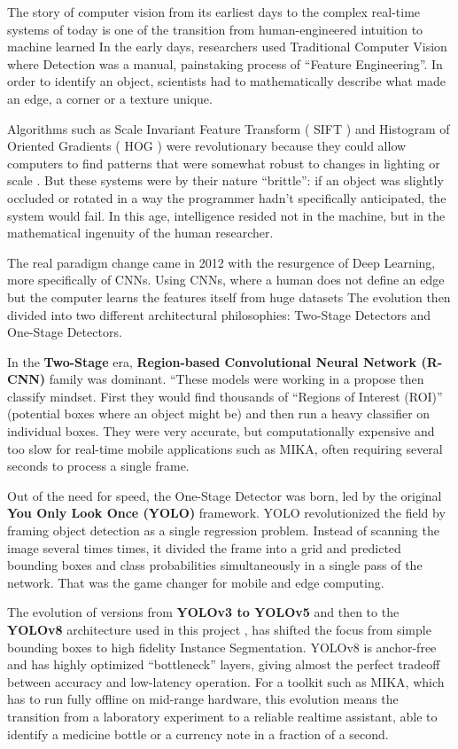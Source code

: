\documentclass[12pt,a4paper]{report}
\begin{document}
\noindent The story of computer vision from its earliest days to the complex real-time systems of today is one of the transition from human-engineered intuition to machine learned In the early days, researchers used Traditional Computer Vision where Detection was a manual, painstaking process of “Feature Engineering”. In order to identify an object, scientists had to mathematically describe what made an edge, a corner or a texture unique.
 
\noindent Algorithms such as Scale Invariant Feature Transform ( SIFT ) and Histogram of Oriented Gradients ( HOG ) were revolutionary because they could allow computers to find patterns that were somewhat robust to changes in lighting or scale . But these systems were by their nature “brittle”: if an object was slightly occluded or rotated in a way the programmer hadn’t specifically anticipated, the system would fail. In this age, intelligence resided not in the machine, but in the mathematical ingenuity of the human researcher. 

\noindent The real paradigm change came in 2012 with the resurgence of Deep Learning, more specifically of CNNs. Using CNNs, where a human does not define an edge but the computer learns the features itself from huge datasets The evolution then divided into two different architectural philosophies: Two-Stage Detectors and One-Stage Detectors.

\noindent In the \textbf{Two-Stage} era, \textbf{Region-based Convolutional Neural Network (R-CNN)} family was dominant. “These models were working in a propose then classify mindset. First they would find thousands of “Regions of Interest (ROI)” (potential boxes where an object might be) and then run a heavy classifier on individual boxes. They were very accurate, but computationally expensive and too slow for real-time mobile applications such as MIKA, often requiring several seconds to process a single frame.
 
\noindent Out of the need for speed, the One-Stage Detector was born, led by the original \textbf{You Only Look Once (YOLO)} framework. YOLO revolutionized the field by framing object detection as a single regression problem. Instead of scanning the image several times times, it divided the frame into a grid and predicted bounding boxes and class probabilities simultaneously in a single pass of the network. That was the game changer for mobile and edge computing.

\noindent The evolution of versions from \textbf{YOLOv3 to YOLOv5} and then to the \textbf{YOLOv8} architecture used in this project , has shifted the focus from simple bounding boxes to high fidelity Instance Segmentation. YOLOv8 is anchor-free and has highly optimized “bottleneck” layers, giving almost the perfect tradeoff between accuracy and low-latency operation. For a toolkit such as MIKA, which has to run fully offline on mid-range hardware, this evolution means the transition from a laboratory experiment to a reliable realtime assistant, able to identify a medicine bottle or a currency note in a fraction of a second.
\end{document}
